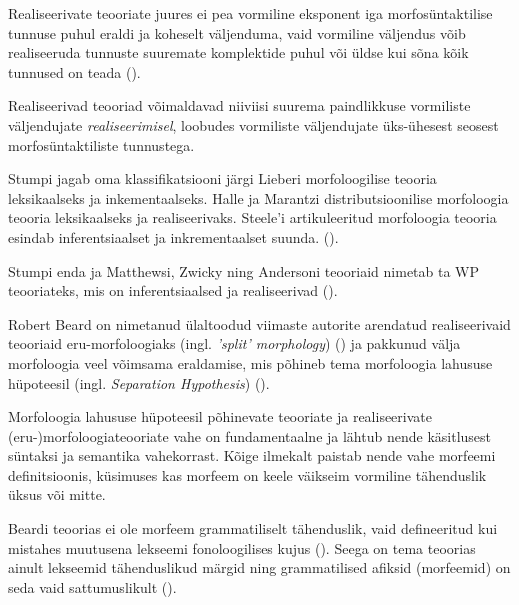 \documentclass[12pt,a4paper]{article}
\begin{document}
Realiseerivate teooriate juures ei pea vormiline eksponent iga morfosüntaktilise tunnuse puhul eraldi ja koheselt väljenduma, vaid vormiline väljendus võib realiseeruda tunnuste suuremate komplektide puhul või üldse kui sõna kõik tunnused on teada (\cite[2]{stump_inflectional_2001}).

Realiseerivad teooriad võimaldavad niiviisi suurema paindlikkuse vormiliste väljendujate \textit{realiseerimisel}, loobudes vormiliste väljendujate üks-ühesest seosest morfosüntaktiliste tunnustega.

Stumpi jagab oma klassifikatsiooni järgi Lieberi morfoloogilise teooria leksikaalseks ja inkementaalseks. Halle ja Marantzi distributsioonilise morfoloogia teooria leksikaalseks ja realiseerivaks. Steele'i artikuleeritud morfoloogia teooria esindab inferentsiaalset ja inkrementaalset suunda. (\cite[2--3]{stump_inflectional_2001}).

Stumpi enda ja Matthewsi, Zwicky ning Andersoni teooriaid nimetab ta WP teooriateks, mis on inferentsiaalsed ja realiseerivad (\cite[3]{stump_inflectional_2001}).



Robert Beard on nimetanud ülaltoodud viimaste autorite arendatud realiseerivaid teooriaid eru-morfoloogiaks (ingl. \textit{'split' morphology}) (\cite[20]{beard_morpheme_1987}) ja pakkunud välja morfoloogia veel võimsama eraldamise, mis põhineb tema morfoloogia lahususe hüpoteesil (ingl. \textit{Separation Hypothesis}) (\cite{beard_lexeme-morpheme_1995}).

Morfoloogia lahususe hüpoteesil põhinevate teooriate ja realiseerivate (eru-)morfoloogia\-teooriate vahe on fundamentaalne ja lähtub nende käsitlusest süntaksi ja semantika vahekorrast. Kõige ilmekalt paistab nende vahe morfeemi definitsioonis, küsimuses kas morfeem on keele väikseim vormiline tähenduslik üksus või mitte.

Beardi teoorias ei ole morfeem grammatiliselt tähenduslik, vaid defineeritud kui mistahes muutusena lekseemi fonoloogilises kujus (\cite[31]{beard_morpheme_1987}). Seega on tema teoorias ainult lekseemid tähenduslikud märgid ning grammatilised afiksid (morfeemid) on seda vaid sattumuslikult (\cite[17]{beard_morpheme_1987}).
\end{document}
